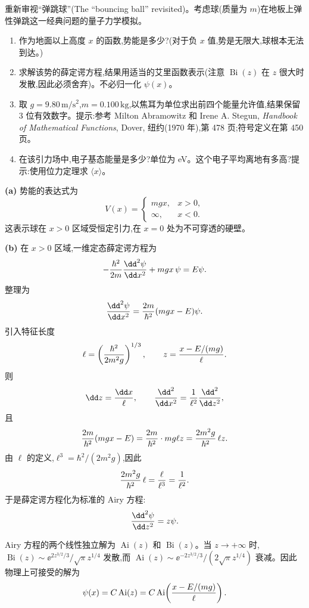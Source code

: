 \begin{question}
重新审视“弹跳球”(The ``bouncing ball'' revisited)。考虑球(质量为 $m$)在地板上弹性弹跳这一经典问题的量子力学模拟。
\begin{enumerate}
\item 作为地面以上高度 $x$ 的函数,势能是多少?(对于负 $x$ 值,势是无限大,球根本无法到达。)
\item 求解该势的薛定谔方程,结果用适当的艾里函数表示(注意 $\operatorname{Bi}(z)$ 在 $z$ 很大时发散,因此必须舍弃)。不必归一化 $\psi(x)$。
\item 取 $g=9.80\,\mathrm{m/s^2}$,$m=0.100\,\mathrm{kg}$,以焦耳为单位求出前四个能量允许值,结果保留 3 位有效数字。提示:参考 Milton Abramowitz 和 Irene A. Stegun, \textit{Handbook of Mathematical Functions}, Dover, 纽约(1970 年),第 478 页;符号定义在第 450 页。
\item 在该引力场中,电子基态能量是多少?单位为 eV。这个电子平均离地有多高?提示:使用位力定理求 $\langle x\rangle$。
\end{enumerate}
\begin{solution}
\textbf{(a)} 势能的表达式为
\[
V(x)=\begin{cases}mgx, & x>0,\\ \infty, & x<0.\end{cases}
\]
这表示球在 $x>0$ 区域受恒定引力,在 $x=0$ 处为不可穿透的硬壁。

\textbf{(b)} 在 $x>0$ 区域,一维定态薛定谔方程为
\[
-{\hbar^2\over2m}{\dd^2\psi\over\dd x^2}+mgx\,\psi=E\psi.
\]
整理为
\[
{\dd^2\psi\over\dd x^2}={2m\over\hbar^2}(mgx-E)\psi.
\]
引入特征长度
\[
\ell=\left({\hbar^2\over2m^2g}\right)^{1/3},
\qquad
z={x-E/(mg)\over\ell}.
\]
则
\[
\dd z={\dd x\over\ell},\qquad
{\dd^2\over\dd x^2}={1\over\ell^2}{\dd^2\over\dd z^2},
\]
且
\[
{2m\over\hbar^2}(mgx-E)
={2m\over\hbar^2}\cdot mg\ell z
={2m^2g\over\hbar^2}\,\ell z.
\]
由 $\ell$ 的定义,$\ell^3=\hbar^2/(2m^2g)$,因此
\[
{2m^2g\over\hbar^2}\,\ell={\ell\over\ell^3}={1\over\ell^2}.
\]
于是薛定谔方程化为标准的 Airy 方程:
\[
{\dd^2\psi\over\dd z^2}=z\psi.
\]

Airy 方程的两个线性独立解为 $\operatorname{Ai}(z)$ 和 $\operatorname{Bi}(z)$。当 $z\to+\infty$ 时,$\operatorname{Bi}(z)\sim \ee^{2z^{3/2}/3}/\sqrt{\pi}z^{1/4}$ 发散,而 $\operatorname{Ai}(z)\sim \ee^{-2z^{3/2}/3}/(2\sqrt{\pi}z^{1/4})$ 衰减。因此物理上可接受的解为
\[
\psi(x)=C\operatorname{Ai}(z)=C\operatorname{Ai}\!\left({x-E/(mg)\over\ell}\right).
\]


\end{solution}
\end{question}
